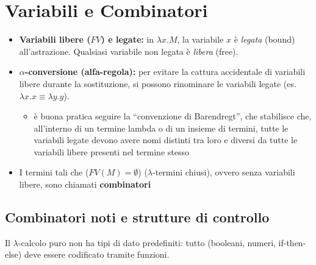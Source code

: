 \section{Variabili e Combinatori}
\begin{itemize}
    \item \textbf{Variabili libere ($FV$) e legate:} in $\lambda x. M$, la variabile $x$ è \textit{legata} (bound) all'astrazione. Qualsiasi variabile non legata è \textit{libera} (free).
    \item \textbf{$\alpha$-conversione (alfa-regola):} per evitare la cattura accidentale di variabili libere durante la sostituzione, si possono rinominare le variabili legate (es. $\lambda x.x \equiv \lambda y.y$). 
        \begin{itemize}
            \item è buona pratica seguire la ``convenzione di Barendregt'', che stabilisce che, all'interno di un termine lambda o di un insieme di termini, tutte le variabili legate devono avere nomi distinti tra loro e diversi da tutte le variabili libere presenti nel termine stesso
        \end{itemize} 
    \item  I termini tali che ($FV(M) = \emptyset$) ($\lambda$-termini chiusi), ovvero senza variabili libere, sono chiamati \textbf{combinatori}
\end{itemize}

\subsection{Combinatori noti e strutture di controllo}
Il $\lambda$-calcolo puro non ha tipi di dato predefiniti: tutto (booleani, numeri, if-then-else) deve essere codificato tramite funzioni.

